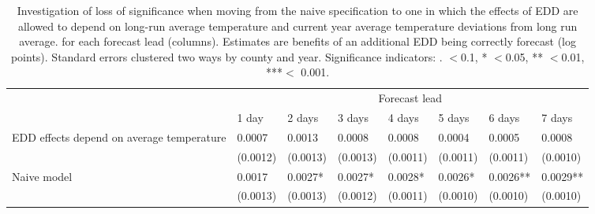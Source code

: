\begin{table}

\caption{\label{tab:rob}Investigation of loss of significance when moving from the naive specification
                    to one in which the effects of EDD are allowed to depend on long-run average temperature and 
                    current year average temperature deviations from long run average. 
      for each forecast lead (columns). Estimates are benefits of an additional EDD 
      being correctly forecast (log points). 
      Standard errors clustered two ways by county and year. 
      Significance indicators: . $<$0.1, * $<$0.05, ** $<$0.01, ***$<$ 0.001.}
\centering
\begin{tabular}[t]{llllllll}
\hline
\multicolumn{1}{c|}{ } & \multicolumn{7}{c}{Forecast lead} \\
  & 1 day & 2 days & 3 days & 4 days & 5 days & 6 days & 7 days\\
\hline
EDD effects depend on average temperature & 0.0007 & 0.0013 & 0.0008 & 0.0008 & 0.0004 & 0.0005 & 0.0008\\
 & (0.0012) & (0.0013) & (0.0013) & (0.0011) & (0.0011) & (0.0011) & (0.0010)\\
\addlinespace
Naive model & 0.0017 & 0.0027* & 0.0027* & 0.0028* & 0.0026* & 0.0026** & 0.0029**\\
 & (0.0013) & (0.0013) & (0.0012) & (0.0011) & (0.0010) & (0.0010) & (0.0010)\\
\hline
\end{tabular}
\end{table}

